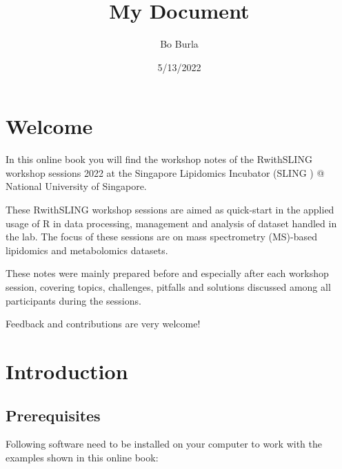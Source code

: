 \documentclass[
  letterpaper,
  DIV=11,
  numbers=noendperiod]{scrreprt}
\title{My Document}
\author{Bo Burla}
\date{5/13/2022}
\renewcommand*\contentsname{Table of contents}
\newcommand\contentsname{Table of contents}
\begin{document}
\maketitle

\ifdefined\Shaded\renewenvironment{Shaded}{\begin{tcolorbox}[interior hidden, boxrule=0pt, breakable, enhanced, sharp corners, frame hidden, borderline west={3pt}{0pt}{shadecolor}]}{\end{tcolorbox}}\fi

\renewcommand*\contentsname{Table of contents}
{
\hypersetup{linkcolor=}
\setcounter{tocdepth}{2}
\tableofcontents
}
\hypertarget{welcome}{%
\chapter*{Welcome}\label{welcome}}

In this online book you will find the workshop notes of the RwithSLING
workshop sessions 2022 at the Singapore Lipidomics Incubator (SLING ) @
National University of Singapore.

These RwithSLING workshop sessions are aimed as quick-start in the
applied usage of R in data processing, management and analysis of
dataset handled in the lab. The focus of these sessions are on mass
spectrometry (MS)-based lipidomics and metabolomics datasets.

These notes were mainly prepared before and especially after each
workshop session, covering topics, challenges, pitfalls and solutions
discussed among all participants during the sessions.

Feedback and contributions are very welcome!

\hypertarget{introduction}{%
\chapter{Introduction}\label{introduction}}

\hypertarget{prerequisites}{%
\section{Prerequisites}\label{prerequisites}}

Following software need to be installed on your computer to work with
the examples shown in this online book:
\end{document}
